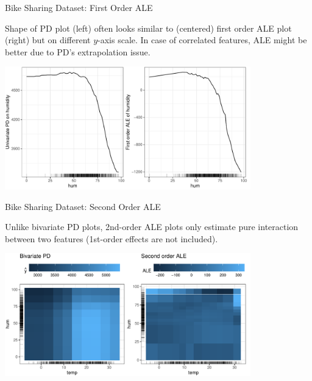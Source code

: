\documentclass[11pt,compress,t,notes=noshow, aspectratio=169, xcolor=table]{beamer}
\begin{document}
\begin{frame}{Bike Sharing Dataset: First Order ALE}

Shape of PD plot (left) often looks similar to (centered) first order ALE plot (right) but on different $y$-axis scale.
In case of correlated features, ALE might be better due to PD's extrapolation issue.


\begin{center}
\includegraphics[width=0.8\textwidth]{figure/ale1d}
\end{center}


\end{frame}


\begin{frame}{Bike Sharing Dataset: Second Order ALE}

Unlike bivariate PD plots, 2nd-order ALE plots only estimate pure interaction between two features (1st-order effects are not included).

\vspace{0.1cm}

\begin{center}
\includegraphics[width=0.8\textwidth]{figure/ale2d}
\end{center}

\end{frame}


\endlecture
\end{document}
